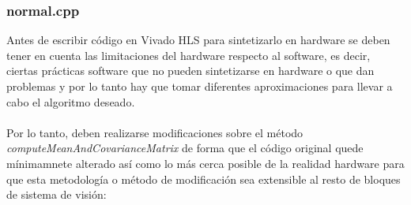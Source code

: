 \subsubsection{normal.cpp}\label{explicacion_software}
Antes de escribir código en Vivado HLS para sintetizarlo en hardware se deben tener en cuenta las limitaciones del hardware respecto al software, es decir, ciertas prácticas software que no pueden sintetizarse en hardware o que dan problemas y por lo tanto hay que tomar diferentes aproximaciones para llevar a cabo el algoritmo deseado. 
\\
\\
Por lo tanto, deben realizarse modificaciones sobre el método \textit{computeMeanAndCovarianceMatrix} de forma que el código original quede mínimamnete alterado así como lo más cerca posible de la realidad hardware para que esta metodología o método de modificación sea extensible al resto de bloques de sistema de visión:

